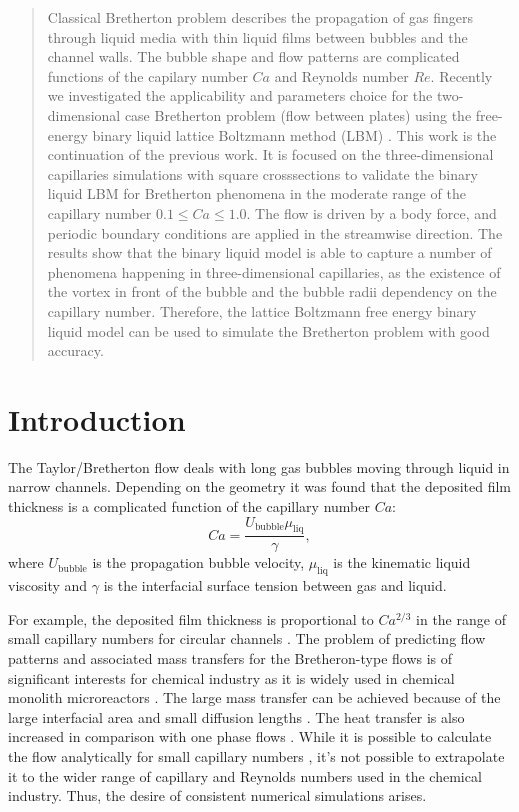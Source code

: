 \documentclass{article}
\begin{document}
\begin{abstract}
Classical Bretherton problem describes the propagation of gas fingers through liquid media with
thin liquid films between bubbles and the channel walls. The bubble shape and flow patterns are
complicated functions of the capilary number $Ca$ and Reynolds number $Re$. Recently we investigated
the applicability and parameters choice for the two-dimensional case Bretherton problem (flow
between plates) using the free-energy binary liquid lattice Boltzmann method (LBM)
\cite{kuzmin-binary2d}. This
work is the continuation of the previous work. It is focused on the three-dimensional capillaries
simulations with square crosssections to
validate the binary liquid LBM for  Bretherton phenomena in the moderate range of the capillary
number $0.1\leq Ca \leq 1.0$.  
The flow is driven by a body force,
and
periodic boundary conditions are applied in the streamwise direction. The results show that the
binary liquid model is able to capture a number of phenomena happening in three-dimensional
capillaries, as the existence of the vortex in front of the bubble and the bubble radii dependency
on the capillary number. Therefore, the lattice Boltzmann free energy binary liquid model can be
used to simulate the Bretherton problem with good accuracy. 
\end{abstract}

\section{Introduction}
The Taylor/Bretherton \cite{bretherton} flow deals with long gas bubbles moving through liquid in
narrow channels. Depending on the geometry it was found that the deposited film thickness
is a complicated function of the capillary number $Ca$:
\begin{equation}
\label{capillary:number:definition}
Ca=\frac{U_{\mathrm{bubble}} \mu_{\mathrm{liq}}}{\gamma},
\end{equation}
where $U_{\mathrm{bubble}}$ is the propagation bubble velocity, $\mu_{\mathrm{liq}}$ is the
kinematic liquid viscosity and $\gamma$ is the interfacial surface tension between gas and liquid. 

For example, the deposited film thickness
is proportional to $Ca^{2/3}$ in the range of small capillary numbers for circular channels
\cite{bretherton,heil-bretherton}. 
The problem of predicting flow patterns and associated mass transfers for the Bretheron-type flows
is of significant interests for chemical industry as it is widely used in chemical monolith
microreactors \cite{kreutzer-pressure-drop}. The large mass transfer can be achieved because of the
large interfacial area and small diffusion lengths \cite{cerro-bubble-train}. The heat transfer is
also increased in comparison with one phase flows \cite{fukugata-levelset}. While it
is possible to calculate the flow analytically for small capillary numbers \cite{bretherton}, it's
not possible to extrapolate it to the wider range of capillary and Reynolds numbers used in the
chemical
industry. Thus, the desire of consistent numerical simulations arises.
\end{document}
